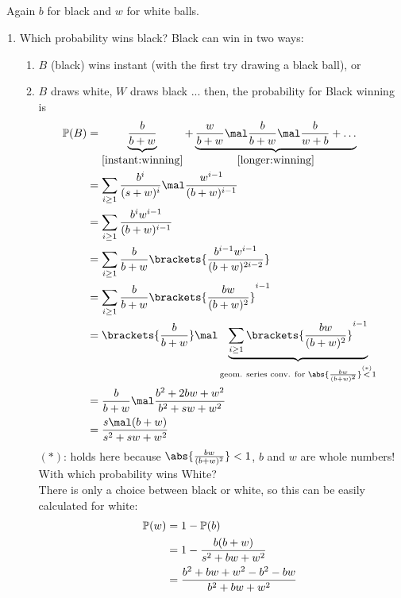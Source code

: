 \subsection{}

\begin{solution}\
	Again $b$ for black and $w$ for white balls.
	\begin{enumerate}[label=\alph*)]
		\item Which probability wins black? Black can win in two ways:
		\begin{enumerate}[label=\arabic*)]
			\item $B$ (black) wins instant (with the first try drawing a black ball), or \label{instant:winning}
			\item $B$ draws white, $W$ draws black ... then, the probability for Black winning is \label{longer:winning}
			\begin{align*}
			\Meas(B) &= \underbrace{\frac{b}{b+w}}_{\ref{instant:winning}} + \underbrace{ \frac{w}{b+w} \mal \frac{b}{b+w} \mal \frac{b}{w+b} + \dots}_{\ref{longer:winning}}\\
			&= \sum_{i \ge 1} \frac{b^i}{(s+w)^i}\mal \frac{w^{i-1}}{(b+w)^{i-1}}\\
								&= \sum_{i \ge 1} \frac{b^i w^{i-1}}{(b+w)^{i-1}}\\
								&= \sum_{i \ge 1} \frac{b}{b+w}\brackets{\frac{b^{i-1} w^{i-1}}{(b+w)^{2i -2}}}\\
								&= \sum_{i \ge 1} \frac{b}{b+w}\brackets{\frac{bw}{(b+w)^2}}^{i-1}\\
								&= \brackets{\frac{b}{b+w}} \mal \underbrace{\sum_{i \ge 1} \brackets{\frac{bw}{(b+w)^2}}^{i-1}}_{\text{geom. series conv. for } \abs{\frac{bw}{(b+w)^2}}\overset{(*)}{<}1}\\
								&= \frac{b}{b+w} \mal \frac{b^2 + 2bw + w^2}{b^2+sw+w^2}\\
								&= \frac{s\mal (b+w)}{s^2 + sw + w^2}
			\end{align*}
			$(*)$: holds here because $\abs{\frac{bw}{(b+w)^2}} < 1$, $b$ and $w$ are whole numbers!\\
			With which probability wins White?\\
			There is only a choice between black or white, so this can be easily calculated for white:
			\begin{align*}
				\Meas(w) &= 1 - \Meas(b)\\
				&= 1 - \frac{b(b+w)}{s^2 + bw + w^2}\\
				&= \frac{b^2 + bw + w^2 - b^2 - bw}{b^2 + bw + w^2}\\

\end{align*}
\end{enumerate}
\end{enumerate}
\end{solution}

